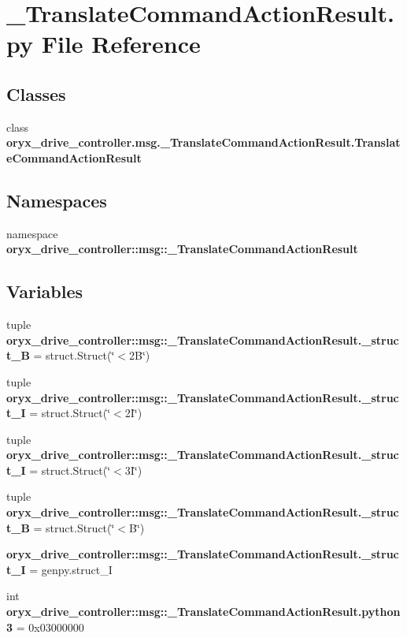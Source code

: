 \section{\-\_\-\-Translate\-Command\-Action\-Result.\-py \-File \-Reference}
\label{__TranslateCommandActionResult_8py}
\subsection*{\-Classes}
\begin{DoxyCompactItemize}
\item 
class {\bf oryx\-\_\-drive\-\_\-controller.\-msg.\-\_\-\-Translate\-Command\-Action\-Result.\-Translate\-Command\-Action\-Result}
\end{DoxyCompactItemize}
\subsection*{\-Namespaces}
\begin{DoxyCompactItemize}
\item 
namespace {\bf oryx\-\_\-drive\-\_\-controller\-::msg\-::\-\_\-\-Translate\-Command\-Action\-Result}
\end{DoxyCompactItemize}
\subsection*{\-Variables}
\begin{DoxyCompactItemize}
\item 
tuple {\bf oryx\-\_\-drive\-\_\-controller\-::msg\-::\-\_\-\-Translate\-Command\-Action\-Result.\-\_\-struct\-\_\-B} = struct.\-Struct(\char`\"{}$<$2\-B\char`\"{})
\item 
tuple {\bf oryx\-\_\-drive\-\_\-controller\-::msg\-::\-\_\-\-Translate\-Command\-Action\-Result.\-\_\-struct\-\_\-I} = struct.\-Struct(\char`\"{}$<$2\-I\char`\"{})
\item 
tuple {\bf oryx\-\_\-drive\-\_\-controller\-::msg\-::\-\_\-\-Translate\-Command\-Action\-Result.\-\_\-struct\-\_\-I} = struct.\-Struct(\char`\"{}$<$3\-I\char`\"{})
\item 
tuple {\bf oryx\-\_\-drive\-\_\-controller\-::msg\-::\-\_\-\-Translate\-Command\-Action\-Result.\-\_\-struct\-\_\-\-B} = struct.\-Struct(\char`\"{}$<$\-B\char`\"{})
\item 
{\bf oryx\-\_\-drive\-\_\-controller\-::msg\-::\-\_\-\-Translate\-Command\-Action\-Result.\-\_\-struct\-\_\-\-I} = genpy.\-struct\-\_\-\-I
\item 
int {\bf oryx\-\_\-drive\-\_\-controller\-::msg\-::\-\_\-\-Translate\-Command\-Action\-Result.\-python3} = 0x03000000
\end{DoxyCompactItemize}
